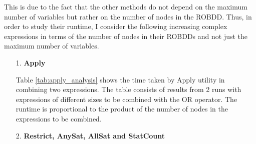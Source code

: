 \documentclass[a4paper, titlepage, 12pt]{article}
\numberwithin{equation}{section}
\begin{document}
            This is due to the fact that the other methods do not depend on the maximum number of variables but rather on the number of nodes in the ROBDD.
            Thus, in order to study their runtime, I consider the following increasing complex expressions in terms of the number of nodes in their ROBDDs and not just the maximum number of variables.
            
            \begin{itemize}
                \item[1.] \textbf{Apply}
                    
                    Table \ref{tab:apply_analysis} shows the time taken by Apply utility in combining two expressions.
                    The table consists of results from 2 runs with expressions of different sizes to be combined with the OR operator.
                    The runtime is proportional to the product of the number of nodes in the expressions to be combined.
                    
                    \begin{table}[!tbh]
                        \centering
                        \caption{Time analysis of Apply.}
                        \label{tab:apply_analysis}
                    \end{table}


                \item[2.] \textbf{Restrict, AnySat, AllSat and StatCount}
                

\end{itemize}
\end{document}
